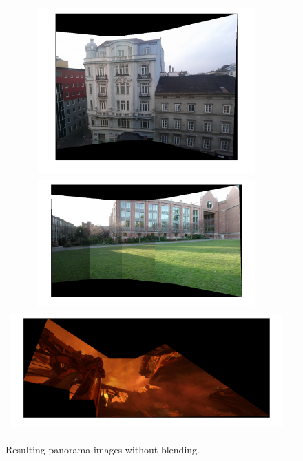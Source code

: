 \begin{figure}[h]
	\centering
	\begin{tabular}{cc}
	\includegraphics[width=0.8\textwidth]{figures/office_p_b.png} \\
	\includegraphics[width=0.8\textwidth]{figures/campus_p_b.png} \\
	\includegraphics[width=1\textwidth]{figures/doom_p_b.png}

	\end{tabular}
	\caption{Resulting panorama images without blending.}
	\label{fig:a4:noblend}
\end{figure}